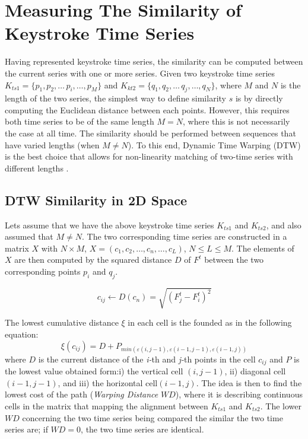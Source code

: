 \documentclass[runningheads,a4paper]{llncs}
\begin{document}
\section{Measuring The Similarity of Keystroke Time Series} 
\label{sec:similarity_KTS}
Having represented keystroke time series, the similarity can be computed between the current series with one or more series. Given two keystroke time series $K_{ts1}=\{p_1,p_2,\dots\,p_i,\dots,p_M\}$ and $K_{kt2}=\{q_1,q_2,\dots\,q_j,\dots,q_N\}$, where $M$ and $N$ is the length of the two series, the simplest way to define similarity $s$ is by directly computing the Euclidean distance between each points. However, this requires both time series to be of the same length $M=N$, where this is not necessarily the case at all time. The similarity should be performed between sequences that have varied lengths (when $M\neq N$). To this end, Dynamic Time Warping (DTW) is the best choice that allows for non-linearity matching of two-time series with different lengths \cite{rabiner1993fundamentals}. 


\subsection{DTW Similarity in 2D Space} \label{subsec:2d_similairty}
Lets assume that we have the above keystroke time series $K_{ts1}$ and $K_{ts2}$, and also assumed that $M\neq N$. The two corresponding time series are constructed in a matrix $X$ with $N\times M$, $X=(c_1,c_2,\dots,c_n,\dots,c_L)$, $N\leqslant L\leqslant M$. The elements of $X$ are then computed by the squared distance $D$ of $F^t$ between the two corresponding points $p_i$ and $q_j$.

\begin{equation}
c_{ij}\leftarrow D(c_n) =\sqrt{(F^t_j-F^t_i)^2}
\end{equation}

\noindent The lowest cumulative distance $\xi$ in each cell is the founded as in the following equation:
\begin{equation}
\xi (c_{ij}) = D + P_{min(\varepsilon (i,j-1),\varepsilon (i-1,j-1),\varepsilon(i-1,j))}
\end{equation}
\noindent where $D$ is the current distance of the \textit{i-}th and \textit{j-}th points in the cell $c_{ij}$ and $P$ is the lowest value obtained form:i) the vertical cell $(i,j-1)$, ii) diagonal cell $(i-1,j-1)$, and iii) the horizontal cell$(i-1,j)$.
\noindent The idea is then to find the lowest cost of the path (\textit{Warping Distance} $WD$), where it is describing continuous cells in the matrix that mapping the alignment between $K_{ts1}$ and $K_{ts2}$. The lower $WD$ concerning the two time series being compared the similar the two time series are; if $WD= 0$, the two time series are identical.
\end{document}
